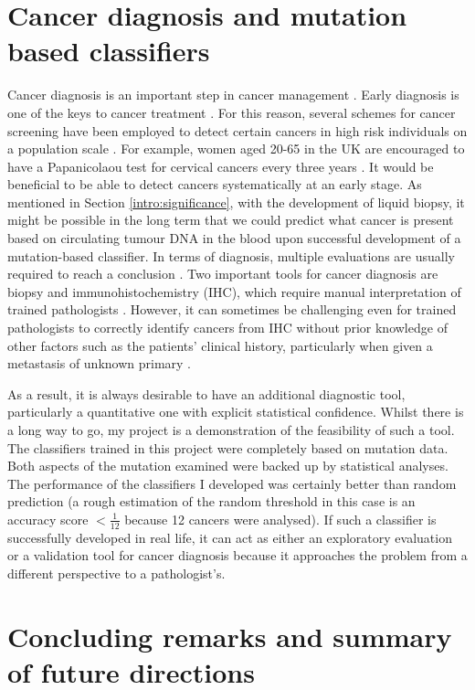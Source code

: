 \section{Cancer diagnosis and mutation based classifiers}
Cancer diagnosis is an important step in cancer management \citep{Tobias2014CancerManagement}. Early diagnosis is one of the keys to cancer treatment \citep{Hawkes2019CancerDiagnosis}. For this reason, several schemes for cancer screening have been employed to detect certain cancers in high risk individuals on a population scale \citep{Tobias2014CancerManagement}. For example, women aged 20-65 in the UK are encouraged to have a Papanicolaou test \citep{Bharadwaj2013HumanTreatment} for cervical cancers every three years \citep{Tobias2014CancerManagement}. It would be beneficial to be able to detect cancers systematically at an early stage. As mentioned in Section \ref{intro:significance}, with the development of liquid biopsy, it might be possible in the long term that we could predict what cancer is present based on circulating tumour DNA in the blood upon successful development of a mutation-based classifier. In terms of diagnosis, multiple evaluations are usually required to reach a conclusion \citep{Tobias2014CancerManagement,Stone1995Biopsy:Pitfalls}. Two important tools for cancer diagnosis are biopsy and immunohistochemistry (IHC), which require manual interpretation of trained pathologists \citep{Stone1995Biopsy:Pitfalls,Ahmed200615Cancer}. However, it can sometimes be challenging even for trained pathologists to correctly identify cancers from IHC without prior knowledge of other factors such as the patients' clinical history, particularly when given a \gls{metastasis} of unknown primary \citep{Sheahan1993MetastaticStatus,Rassy2020ExploringToday}.  

As a result, it is always desirable to have an additional diagnostic tool, particularly a quantitative one with explicit statistical confidence. Whilst there is a long way to go, my project is a demonstration of the feasibility of such a tool. The classifiers trained in this project were completely based on mutation data. Both aspects of the mutation examined were backed up by statistical analyses. The performance of the classifiers I developed was certainly better than random prediction (a rough estimation of the random threshold in this case is an accuracy score $<\frac{1}{12}$ because 12 cancers were analysed). If such a classifier is successfully developed in real life, it can act as either an exploratory evaluation or a validation tool for cancer diagnosis because it approaches the problem from a different perspective to a pathologist's. 

\section{Concluding remarks and summary of future directions}